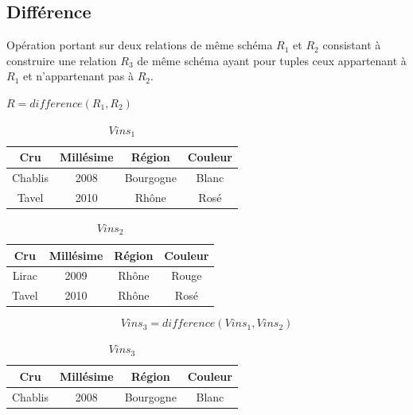 \documentclass[12pt,a4paper,openany]{book}
\begin{document}
		\subsection{Différence}
		\begin{definition}
			Opération portant sur deux relations de même schéma $R_1$ et $R_2$ consistant à construire une relation $R_3$ de même schéma ayant pour
			tuples ceux appartenant à $R_1$ et n'appartenant pas à $R_2$.
		\end{definition}

		\begin{notation}
			$R = difference(R_1,R_2)$
		\end{notation}
		\begin{exemple}
			\begin{table}[H]
			\centering
			\begin{tabular}{c|c|c|c}
				\textbf{Cru} & \textbf{Millésime} & \textbf{Région} & \textbf{Couleur}\\
				\hline
				Chablis & 2008 & Bourgogne & Blanc\\
				Tavel & 2010 & Rhône & Rosé\\
			\end{tabular}
			\caption{$Vins_1$}
		\end{table}
		\begin{table}[H]
			\centering
			\begin{tabular}{c|c|c|c}
				\textbf{Cru} & \textbf{Millésime} & \textbf{Région} & \textbf{Couleur}\\
				\hline
				Lirac & 2009 & Rhône & Rouge \\
				Tavel & 2010 & Rhône & Rosé\\
			\end{tabular}
			\caption{$Vins_2$}
		\end{table}
		$$Vins_3 = difference(Vins_1, Vins_2)$$
		\begin{table}[H]
			\centering
			\begin{tabular}{c|c|c|c}
				\textbf{Cru} & \textbf{Millésime} & \textbf{Région} & \textbf{Couleur}\\
				\hline
				Chablis & 2008 & Bourgogne & Blanc
			\end{tabular}
			\caption{$Vins_3$}
		\end{table}
		\end{exemple}
\end{document}

